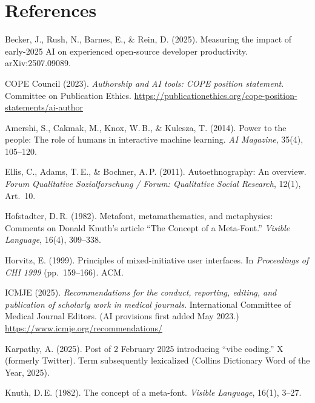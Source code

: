 \documentclass[11pt]{article}
\begin{document}
\section*{References}
\begin{list}{}{\setlength{\itemindent}{-2em}\setlength{\leftmargin}{2em}\setlength{\itemsep}{2pt}}

\item Becker, J., Rush, N., Barnes, E., \& Rein, D. (2025). Measuring the impact of early-2025 AI on experienced open-source developer productivity. arXiv:2507.09089.

\item COPE Council (2023). \emph{Authorship and AI tools: COPE position statement}. Committee on Publication Ethics. \url{https://publicationethics.org/cope-position-statements/ai-author}

\item Amershi, S., Cakmak, M., Knox, W.\,B., \& Kulesza, T. (2014). Power to the people: The role of humans in interactive machine learning. \emph{AI Magazine}, 35(4), 105--120.

\item Ellis, C., Adams, T.\,E., \& Bochner, A.\,P. (2011). Autoethnography: An overview. \emph{Forum Qualitative Sozialforschung / Forum: Qualitative Social Research}, 12(1), Art.\ 10.

\item Hofstadter, D.\,R. (1982). Metafont, metamathematics, and metaphysics: Comments on Donald Knuth's article ``The Concept of a Meta-Font.'' \emph{Visible Language}, 16(4), 309--338.

\item Horvitz, E. (1999). Principles of mixed-initiative user interfaces. In \emph{Proceedings of CHI 1999} (pp.\ 159--166). ACM.

\item ICMJE (2025). \emph{Recommendations for the conduct, reporting, editing, and publication of scholarly work in medical journals}. International Committee of Medical Journal Editors. (AI provisions first added May 2023.) \url{https://www.icmje.org/recommendations/}

\item Karpathy, A. (2025). Post of 2 February 2025 introducing ``vibe coding.'' X (formerly Twitter). Term subsequently lexicalized (Collins Dictionary Word of the Year, 2025).

\item Knuth, D.\,E. (1982). The concept of a meta-font. \emph{Visible Language}, 16(1), 3--27.


\end{list}
\end{document}
